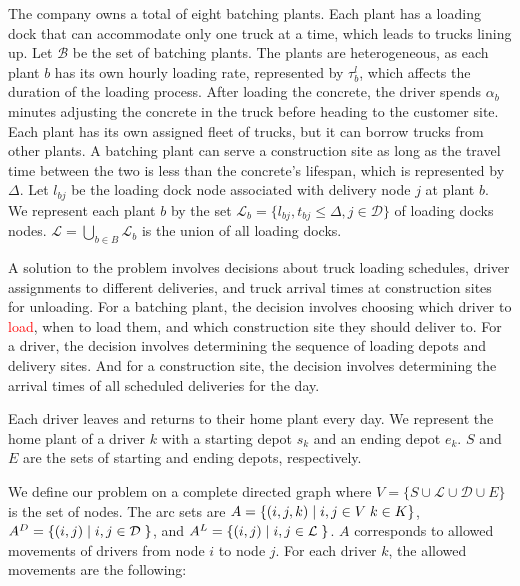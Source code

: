 \documentclass{article}
\begin{document}

The company owns a total of eight batching plants. Each plant has a loading dock that can accommodate only one truck at a time, which leads to trucks lining up. Let $\mathcal{B}$ be the set of batching plants. The plants are heterogeneous, as each plant $b$ has its own hourly loading rate, represented by $\tau^l_b$, which affects the duration of the loading process. After loading the concrete, the driver spends $\alpha_b$ minutes adjusting the concrete in the truck before heading to the customer site. Each plant has its own assigned fleet of trucks, but it can borrow trucks from other plants. %
 A batching plant can serve a construction site as long as the travel time between the two is less than the concrete's lifespan, which is represented by $\Delta$. Let $l_{bj}$ be the loading dock node associated with delivery node $j$ at plant $b$.
We represent each plant $b$ by the set $\mathcal{L}_b = \{l_{bj}, t_{bj}\leq  \Delta, j \in \mathcal{D} \}$  of loading docks nodes. $\mathcal{L}=\bigcup_{b\in B} \mathcal{L}_b$ is the union of all loading docks. 

A solution to the problem involves decisions about truck loading schedules, driver assignments to different deliveries, and truck arrival times at construction sites for unloading. For a batching plant, the decision involves choosing which driver to \textcolor{red}{load}, when to load them, and which construction site they should deliver to. For a driver, the decision involves determining the sequence of loading depots and delivery sites. And for a construction site, the decision involves determining the arrival times of all scheduled deliveries for the day.

Each driver leaves and returns to their home plant every day. We represent the home plant of a driver $k$ with a starting depot $s_k$ and an ending depot $e_k$. $S$ and $E$ are the sets of starting and ending depots, respectively.

We define our problem on a complete directed graph where $V=\{ S \cup \mathcal{L} \cup \mathcal{D} \cup E\}$ is the set of nodes. The arc sets are $A =  \{(i,j,k) \hspace*{1mm} \vert \hspace*{1mm} i, j \in V \hspace{1mm} k\in K \}$, $A^D = \{(i,j) \hspace*{1mm} \vert \hspace*{1mm} i, j \in \mathcal{D} \hspace{1mm} \}$, and $A^L = \{(i,j) \hspace*{1mm} \vert \hspace*{1mm} i, j \in \mathcal{L} \hspace{1mm} \}$. 
$A$ corresponds to allowed movements of drivers from node $i$ to node $j$. For each driver $k$, the allowed movements are the following:
\end{document}
